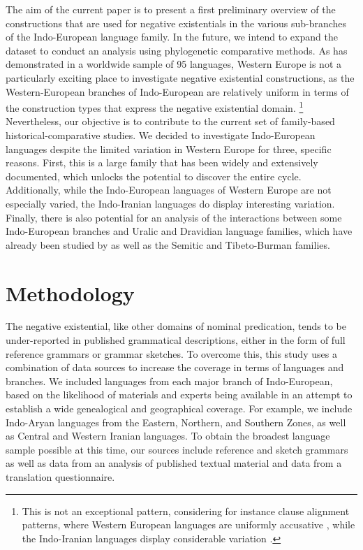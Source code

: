 ﻿\documentclass[output=paper]{langsci/langscibook}
\begin{document}
The aim of the current paper is to present a first preliminary overview of
the constructions that are used for negative existentials in the various
sub-branches of the Indo-European language family. In the future, we intend
to expand the dataset to conduct an analysis using phylogenetic comparative
methods. As \citet{Veselinova2013} has demonstrated in a worldwide sample
of 95 languages, Western Europe is not a particularly exciting place to
investigate negative existential constructions, as the Western-European
branches of Indo-European are relatively uniform in terms of the
construction types that express the negative existential
domain.%
%
\footnote{This is not an exceptional pattern, considering for instance
clause alignment patterns, where Western European languages are uniformly
accusative \citep{Siewierska2013}, while the Indo-Iranian languages display
considerable variation \parencites{Haig2008}{Verbeke2013}.} 
%
Nevertheless, our objective is to contribute to
the current set of family-based historical-comparative studies. We decided
to investigate Indo-European languages despite the limited variation in
Western Europe for three, specific reasons. First, this is a large family
that has been widely and extensively documented, which unlocks the
potential to discover the entire cycle. Additionally, while the
Indo-European languages of Western Europe are not especially varied, the
Indo-Iranian languages do display interesting variation. Finally, there is
also potential for an analysis of the interactions between some
Indo-European branches and Uralic and Dravidian language families, which
have already been studied by \citet{Veselinova2015,Veselinova2016} as well as the Semitic
and Tibeto-Burman families. 

\section{Methodology}\label{sec:ieur-3}

The negative existential, like other domains of nominal predication, tends
to be under-reported in published grammatical descriptions, either in the
form of full reference grammars or grammar sketches. To overcome this, this
study uses a combination of data sources to increase the coverage in terms
of languages and branches. We included languages from each major branch of
Indo-European, based on the likelihood of materials and experts being
available in an attempt to establish a wide genealogical and geographical
coverage. For example, we include Indo-Aryan languages from the Eastern,
Northern, and Southern Zones, as well as Central and Western Iranian
languages. To obtain the broadest language sample possible at this time,
our sources include reference and sketch grammars as well as data from an
analysis of published textual material and data from a translation
questionnaire.
\end{document}
